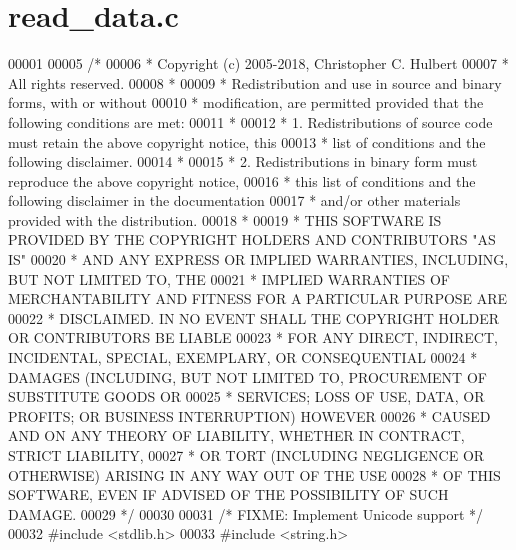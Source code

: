 \hypertarget{read__data_8c_source}{}\section{read\+\_\+data.\+c}
\label{read__data_8c_source}

\begin{DoxyCode}
00001 
00005 \textcolor{comment}{/*}
00006 \textcolor{comment}{ * Copyright (c) 2005-2018, Christopher C. Hulbert}
00007 \textcolor{comment}{ * All rights reserved.}
00008 \textcolor{comment}{ *}
00009 \textcolor{comment}{ * Redistribution and use in source and binary forms, with or without}
00010 \textcolor{comment}{ * modification, are permitted provided that the following conditions are met:}
00011 \textcolor{comment}{ *}
00012 \textcolor{comment}{ * 1. Redistributions of source code must retain the above copyright notice, this}
00013 \textcolor{comment}{ *    list of conditions and the following disclaimer.}
00014 \textcolor{comment}{ *}
00015 \textcolor{comment}{ * 2. Redistributions in binary form must reproduce the above copyright notice,}
00016 \textcolor{comment}{ *    this list of conditions and the following disclaimer in the documentation}
00017 \textcolor{comment}{ *    and/or other materials provided with the distribution.}
00018 \textcolor{comment}{ *}
00019 \textcolor{comment}{ * THIS SOFTWARE IS PROVIDED BY THE COPYRIGHT HOLDERS AND CONTRIBUTORS "AS IS"}
00020 \textcolor{comment}{ * AND ANY EXPRESS OR IMPLIED WARRANTIES, INCLUDING, BUT NOT LIMITED TO, THE}
00021 \textcolor{comment}{ * IMPLIED WARRANTIES OF MERCHANTABILITY AND FITNESS FOR A PARTICULAR PURPOSE ARE}
00022 \textcolor{comment}{ * DISCLAIMED. IN NO EVENT SHALL THE COPYRIGHT HOLDER OR CONTRIBUTORS BE LIABLE}
00023 \textcolor{comment}{ * FOR ANY DIRECT, INDIRECT, INCIDENTAL, SPECIAL, EXEMPLARY, OR CONSEQUENTIAL}
00024 \textcolor{comment}{ * DAMAGES (INCLUDING, BUT NOT LIMITED TO, PROCUREMENT OF SUBSTITUTE GOODS OR}
00025 \textcolor{comment}{ * SERVICES; LOSS OF USE, DATA, OR PROFITS; OR BUSINESS INTERRUPTION) HOWEVER}
00026 \textcolor{comment}{ * CAUSED AND ON ANY THEORY OF LIABILITY, WHETHER IN CONTRACT, STRICT LIABILITY,}
00027 \textcolor{comment}{ * OR TORT (INCLUDING NEGLIGENCE OR OTHERWISE) ARISING IN ANY WAY OUT OF THE USE}
00028 \textcolor{comment}{ * OF THIS SOFTWARE, EVEN IF ADVISED OF THE POSSIBILITY OF SUCH DAMAGE.}
00029 \textcolor{comment}{ */}
00030 
00031 \textcolor{comment}{/* FIXME: Implement Unicode support */}
00032 \textcolor{preprocessor}{#include <stdlib.h>}
00033 \textcolor{preprocessor}{#include <string.h>}

\end{DoxyCode}

